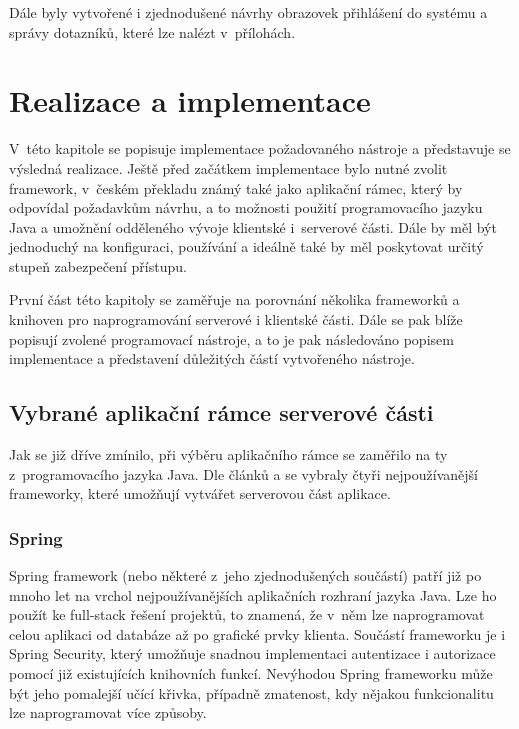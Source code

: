 Dále byly vytvořené i zjednodušené návrhy obrazovek přihlášení do systému a správy dotazníků, které lze nalézt v~přílohách.
    
\chapter{Realizace a implementace}
\label{implementace}

V~této kapitole se popisuje implementace požadovaného nástroje a představuje se výsledná realizace. Ještě před začátkem implementace bylo nutné zvolit framework, v~českém překladu známý také jako aplikační rámec, který by odpovídal požadavkům návrhu, a to možnosti použití programovacího jazyku Java a umožnění odděleného vývoje klientské i~serverové části. Dále by měl být jednoduchý na konfiguraci, používání a ideálně také by měl poskytovat určitý stupeň zabezpečení přístupu. 

První část této kapitoly se zaměřuje na porovnání několika frameworků a knihoven pro naprogramování serverové i klientské části. Dále se pak blíže popisují zvolené programovací nástroje, a to je pak následováno popisem implementace a představení důležitých částí vytvořeného nástroje. 

\section{Vybrané aplikační rámce serverové části}

Jak se již dříve zmínilo, při výběru aplikačního rámce se zaměřilo na ty z~programovacího jazyka Java. Dle článků \cite{FBackend2} a \cite{FBackend1} se vybraly čtyři nejpoužívanější frameworky, které umožňují vytvářet serverovou část aplikace.

\subsection{Spring}

Spring framework (nebo některé z~jeho zjednodušených součástí) patří již po mnoho let na vrchol nejpoužívanějších aplikačních rozhraní jazyka Java. Lze ho použít ke full-stack řešení projektů, to znamená, že v~něm lze naprogramovat celou aplikaci od databáze až po grafické prvky klienta. Součástí frameworku je i Spring Security, který umožňuje snadnou implementaci autentizace i autorizace pomocí již existujících knihovních funkcí. Nevýhodou Spring frameworku může být jeho pomalejší učící křivka, případně zmatenost, kdy nějakou funkcionalitu lze naprogramovat více způsoby.


